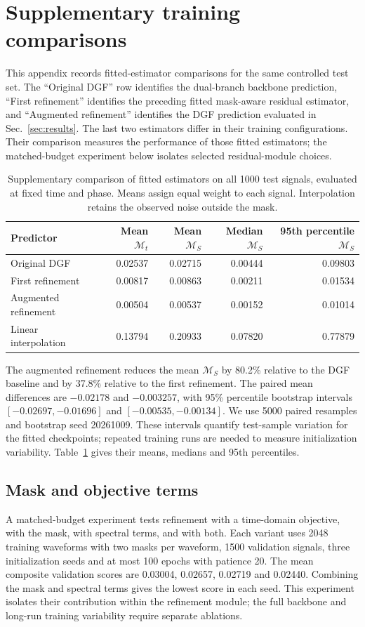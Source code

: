 \documentclass[10pt,prd,aps,a4paper,twocolumn,superscriptaddress,nofootinbib,floatfix]{revtex4-2}
\begin{document}
\section{Supplementary training comparisons}\label{app:training_checks}
This appendix records fitted-estimator comparisons for the same controlled test set. The ``Original DGF'' row identifies the dual-branch backbone prediction, ``First refinement'' identifies the preceding fitted mask-aware residual estimator, and ``Augmented refinement'' identifies the DGF prediction evaluated in Sec.~\ref{sec:results}. The last two estimators differ in their training configurations. Their comparison measures the performance of those fitted estimators; the matched-budget experiment below isolates selected residual-module choices.
\begin{table}[t]\centering
\caption{Supplementary comparison of fitted estimators on all 1000 test signals, evaluated at fixed time and phase. Means assign equal weight to each signal. Interpolation retains the observed noise outside the mask.}\label{tab:training_comparisons}
\begin{tabular}{lrrrr}\hline\hline
Predictor & Mean $\mathcal M_t$ & Mean $\mathcal M_S$ & Median $\mathcal M_S$ & 95th percentile $\mathcal M_S$\\\hline
Original DGF & 0.02537 & 0.02715 & 0.00444 & 0.09803 \\
First refinement & 0.00817 & 0.00863 & 0.00211 & 0.01534 \\
Augmented refinement & 0.00504 & 0.00537 & 0.00152 & 0.01014 \\
Linear interpolation & 0.13794 & 0.20933 & 0.07820 & 0.77879 \\
\hline\hline\end{tabular}\end{table}

The augmented refinement reduces the mean $\mathcal M_S$ by 80.2\% relative to the DGF baseline and by 37.8\% relative to the first refinement. The paired mean differences are $-0.02178$ and $-0.003257$, with 95\% percentile bootstrap intervals $[-0.02697,-0.01696]$ and $[-0.00535,-0.00134]$. We use 5000 paired resamples and bootstrap seed 20261009. These intervals quantify test-sample variation for the fitted checkpoints; repeated training runs are needed to measure initialization variability. Table~\ref{tab:training_comparisons} gives their means, medians and 95th percentiles.
\subsection{Mask and objective terms}
A matched-budget experiment tests refinement with a time-domain objective, with the mask, with spectral terms, and with both. Each variant uses 2048 training waveforms with two masks per waveform, 1500 validation signals, three initialization seeds and at most 100 epochs with patience 20. The mean composite validation scores are 0.03004, 0.02657, 0.02719 and 0.02440. Combining the mask and spectral terms gives the lowest score in each seed. This experiment isolates their contribution within the refinement module; the full backbone and long-run training variability require separate ablations.
\end{document}
